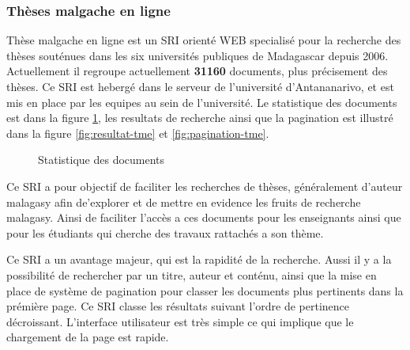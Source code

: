 \subsubsection{Thèses malgache en ligne}
Thèse malgache en ligne \citep{these-malgache-en-ligne} est un SRI orienté WEB specialisé pour la recherche des thèses souténues dans les six universités publiques de Madagascar depuis 2006. Actuellement il regroupe actuellement \textbf{31160} documents, plus précisement des thèses. Ce SRI est hebergé dans le serveur de l'université d'Antananarivo, et est mis en place par les equipes au sein de l'université. Le statistique des documents est dans la figure \ref{fig:statistic-tme}, les resultats de recherche ainsi que la pagination est illustré dans la figure \ref{fig:resultat-tme} et \ref{fig:pagination-tme}.

\begin{figure}[htbp]
	\begin{center}
	\end{center}
	\caption{Statistique des documents \citep{these-malgache-en-ligne}}
	\label{fig:statistic-tme}
\end{figure}

Ce SRI a pour objectif de faciliter les recherches de thèses, généralement d'auteur malagasy afin de'explorer et de mettre en evidence les fruits de recherche malagasy. Ainsi de faciliter l'accès a ces documents pour les enseignants ainsi que pour les étudiants qui cherche des travaux rattachés a son thème.

Ce SRI a un avantage majeur, qui est la rapidité de la recherche. Aussi il y a la possibilité de rechercher par un titre, auteur et conténu, ainsi que la mise en place de système de pagination pour classer les documents plus pertinents dans la prémière page. Ce SRI classe les résultats suivant l'ordre de pertinence décroissant. L'interface utilisateur est très simple ce qui implique que le chargement de la page est rapide.

